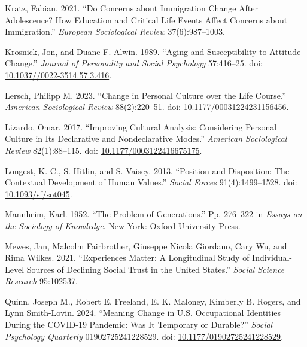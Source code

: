 \documentclass[
  12pt,
]{article}
\newlength{\cslhangindent}
\newlength{\cslentryspacingunit} %
\newenvironment{CSLReferences}[2] %
 {%
  \setlength{\parindent}{0pt}
  \ifodd #1
  \let\oldpar\par
  \def\par{\hangindent=\cslhangindent\oldpar}
  \fi
  \setlength{\parskip}{#2\cslentryspacingunit}
 }%
 {}
\begin{document}
\begin{CSLReferences}{1}{0}
\leavevmode{}%
Kratz, Fabian. 2021. {``Do Concerns about Immigration Change After
Adolescence? How Education and Critical Life Events Affect Concerns
about Immigration.''} \emph{European Sociological Review}
37(6):987--1003.

\leavevmode{}%
Krosnick, Jon, and Duane F. Alwin. 1989. {``Aging and {Susceptibility}
to {Attitude} {Change}.''} \emph{Journal of Personality and Social
Psychology} 57:416--25. doi:
\href{https://doi.org/10.1037//0022-3514.57.3.416}{10.1037//0022-3514.57.3.416}.

\leavevmode{}%
Lersch, Philipp M. 2023. {``Change in {Personal} {Culture} over the
{Life} {Course}.''} \emph{American Sociological Review} 88(2):220--51.
doi:
\href{https://doi.org/10.1177/00031224231156456}{10.1177/00031224231156456}.

\leavevmode{}%
Lizardo, Omar. 2017. {``Improving {Cultural} {Analysis}: {Considering}
{Personal} {Culture} in Its {Declarative} and {Nondeclarative}
{Modes}.''} \emph{American Sociological Review} 82(1):88--115. doi:
\href{https://doi.org/10.1177/0003122416675175}{10.1177/0003122416675175}.

\leavevmode{}%
Longest, K. C., S. Hitlin, and S. Vaisey. 2013. {``Position and
{Disposition}: {The} {Contextual} {Development} of {Human} {Values}.''}
\emph{Social Forces} 91(4):1499--1528. doi:
\href{https://doi.org/10.1093/sf/sot045}{10.1093/sf/sot045}.

\leavevmode{}%
Mannheim, Karl. 1952. {``The {Problem} of {Generations}.''} Pp. 276--322
in \emph{Essays on the {Sociology} of {Knowledge}}. New York: Oxford
University Press.

\leavevmode{}%
Mewes, Jan, Malcolm Fairbrother, Giuseppe Nicola Giordano, Cary Wu, and
Rima Wilkes. 2021. {``Experiences Matter: A Longitudinal Study of
Individual-Level Sources of Declining Social Trust in the United
States.''} \emph{Social Science Research} 95:102537.

\leavevmode{}%
Quinn, Joseph M., Robert E. Freeland, E. K. Maloney, Kimberly B. Rogers,
and Lynn Smith-Lovin. 2024. {``Meaning {Change} in {U}.{S}.
{Occupational} {Identities} During the {COVID}-19 {Pandemic}: {Was} {It}
{Temporary} or {Durable}?''} \emph{Social Psychology Quarterly}
01902725241228529. doi:
\href{https://doi.org/10.1177/01902725241228529}{10.1177/01902725241228529}.


\end{CSLReferences}
\end{document}

